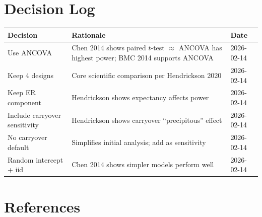 \documentclass[11pt,letterpaper]{article}
\begin{document}
\section{Decision Log}

\begin{table}[h]
\centering\small
\begin{tabular}{@{}L{3.5cm}L{8cm}l@{}}
\toprule
Decision & Rationale & Date \\
\midrule
Use ANCOVA & Chen 2014 shows paired $t$-test $\approx$ ANCOVA has highest power; BMC 2014 supports ANCOVA & 2026-02-14 \\
Keep 4 designs & Core scientific comparison per Hendrickson 2020 & 2026-02-14 \\
Keep ER component & Hendrickson shows expectancy affects power & 2026-02-14 \\
Include carryover sensitivity & Hendrickson shows carryover ``precipitous'' effect & 2026-02-14 \\
No carryover default & Simplifies initial analysis; add as sensitivity & 2026-02-14 \\
Random intercept + iid & Chen 2014 shows simpler models perform well & 2026-02-14 \\
\bottomrule
\end{tabular}
\end{table}


\section{References}
\end{document}
